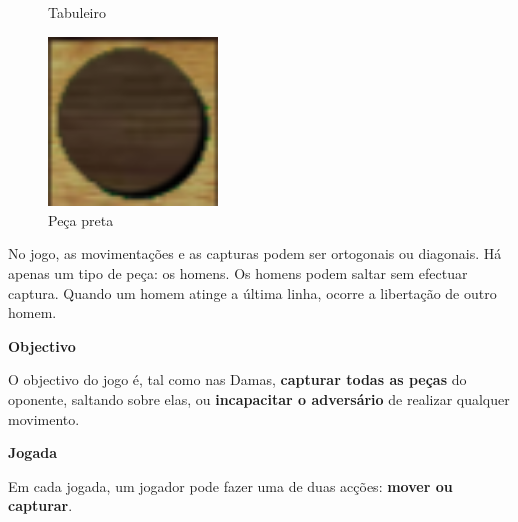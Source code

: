 \documentclass[a4paper]{article}
\begin{document}
\begin{small}
\begin{figure}[h!]
\begin{minipage}[h!]{0.2\textwidth}
    \caption{Tabuleiro}
    \label{fig:3}
  \end{minipage}
	\quad\quad\quad
  \begin{minipage}[h!]{0.2\textwidth}
    \includegraphics[width=0.4\textwidth]{res/black_piece.png}
	\centering
    \caption{Peça preta}
    \label{fig:4}
  \end{minipage}
\end{figure}

No jogo, as movimentações e as capturas podem ser ortogonais ou diagonais. Há apenas um tipo de peça: os homens. Os homens podem saltar sem efectuar captura. Quando um homem atinge a última linha, ocorre a libertação de outro homem.
\end{small}\newline

\large{\textbf{Objectivo}}
\begin{small}

O objectivo do jogo é, tal como nas Damas, \textbf{capturar todas as peças} do oponente, saltando sobre elas, ou \textbf{incapacitar o adversário} de realizar qualquer movimento.
\end{small}\newline

\large{\textbf{Jogada}}
\begin{small}

Em cada jogada, um jogador pode fazer uma de duas acções: \textbf{mover ou capturar}.
\end{small}\newline
\end{document}
